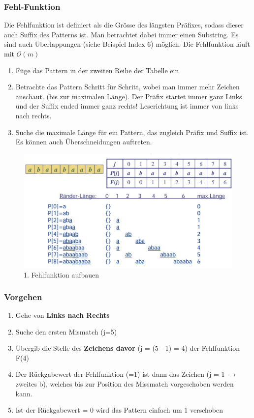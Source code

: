 \subsubsection{Fehl-Funktion}
Die Fehlfunktion ist definiert als die Grösse des längsten Präfixes, sodass dieser auch Suffix des Patterns ist. Man betrachtet dabei immer einen Substring. Es sind auch Überlappungen (siehe Beispiel Index 6) möglich. Die Fehlfunktion läuft mit $\mathcal{O}(m)$

\begin{enumerate}
	\item Füge das Pattern in der zweiten Reihe der Tabelle ein
	\item Betrachte das Pattern Schritt für Schritt, wobei man immer mehr Zeichen anschaut. (bis zur maximalen Länge). Der Präfix startet immer ganz Links und der Suffix ended immer ganz rechts! Leserichtung ist immer von links nach rechts.
	\item Suche die maximale Länge für ein Pattern, das zugleich Präfix und Suffix ist. Es können auch Überschneidungen auftreten.
\end{enumerate}

\begin{figure}[h]
\centering
\includegraphics[width=0.9\linewidth]{images/fehlfunktion}
\caption{1. Fehlfunktion aufbauen}
\label{fig:fehlfunktion}
\end{figure}

\clearpage

\subsubsection{Vorgehen}
\begin{enumerate}
	\item Gehe von \textbf{Links nach Rechts}
	\item Suche den ersten Mismatch (j=5)
	\item Übergib die Stelle des \textbf{Zeichens davor} (j = (5 - 1) = 4) der Fehlfunktion F(4)
	\item Der Rückgabewert der Fehlfunktion (=1) ist dann das Zeichen (j = 1 $\rightarrow$ zweites b), welches bis zur Position des Missmatch vorgeschoben werden kann.
	\item Ist der Rückgabewert = 0 wird das Pattern einfach um 1 verschoben
\end{enumerate}


